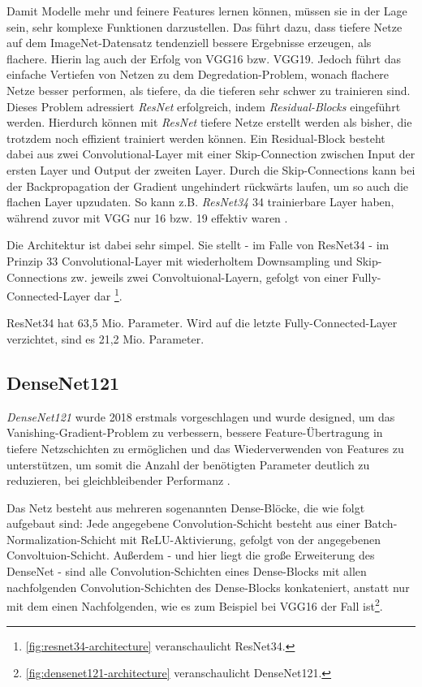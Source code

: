 Damit Modelle mehr und feinere Features lernen können, müssen sie in der Lage sein, sehr komplexe Funktionen darzustellen. 
Das führt dazu, dass tiefere Netze auf dem ImageNet-Datensatz tendenziell bessere Ergebnisse erzeugen, als flachere. 
Hierin lag auch der Erfolg von VGG16 bzw. VGG19. Jedoch führt das einfache Vertiefen von Netzen zu dem Degredation-Problem, wonach 
flachere Netze besser performen, als tiefere, da die tieferen sehr schwer zu trainieren sind. \\
Dieses Problem adressiert \textit{ResNet} erfolgreich, indem \textit{Residual-Blocks} eingeführt werden. 
Hierdurch können mit \textit{ResNet} tiefere Netze erstellt werden als bisher, die trotzdem noch effizient trainiert werden können.
Ein Residual-Block besteht dabei aus zwei Convolutional-Layer mit einer Skip-Connection zwischen Input der ersten Layer und Output 
der zweiten Layer. Durch die Skip-Connections kann bei der Backpropagation der Gradient ungehindert rückwärts laufen, 
um so auch die flachen Layer upzudaten. So kann z.B. \textit{ResNet34} 34 trainierbare Layer haben, 
während zuvor mit VGG nur 16 bzw. 19 effektiv waren \cite{He.10122015}. 

Die Architektur ist dabei sehr simpel. Sie stellt - im Falle von ResNet34 - im Prinzip 33 Convolutional-Layer mit wiederholtem Downsampling 
und Skip-Connections zw. jeweils zwei Convoltuional-Layern, gefolgt von einer Fully-Connected-Layer dar \cite{He.10122015}\footnote{\autoref{fig:resnet34-architecture} veranschaulicht ResNet34.}.

ResNet34 hat 63,5 Mio. Parameter. Wird auf die letzte Fully-Connected-Layer verzichtet, sind es 21,2 Mio. Parameter.


\subsection{DenseNet121} \label{sec:pretrained-backbones:densenet121}

\textit{DenseNet121} wurde 2018 erstmals vorgeschlagen und wurde designed, um das Vanishing-Gradient-Problem 
zu verbessern, bessere Feature-Übertragung in tiefere Netzschichten zu ermöglichen und das Wiederverwenden von Features 
zu unterstützen, um somit die Anzahl der benötigten Parameter deutlich zu reduzieren, bei gleichbleibender Performanz \cite{Huang.25082016}.

Das Netz besteht aus mehreren sogenannten Dense-Blöcke, die wie folgt aufgebaut sind: 
Jede angegebene Convolution-Schicht besteht aus einer Batch-Normalization-Schicht mit \ac{ReLU}-Aktivierung,
gefolgt von der angegebenen Convoltuion-Schicht. Außerdem - und hier liegt die große Erweiterung des DenseNet - sind alle 
Convolution-Schichten eines Dense-Blocks mit allen nachfolgenden Convolution-Schichten des Dense-Blocks konkateniert,
anstatt nur mit dem einen Nachfolgenden, wie es zum Beispiel bei VGG16 der Fall ist\footnote{\autoref{fig:densenet121-architecture} veranschaulicht DenseNet121.}. 

